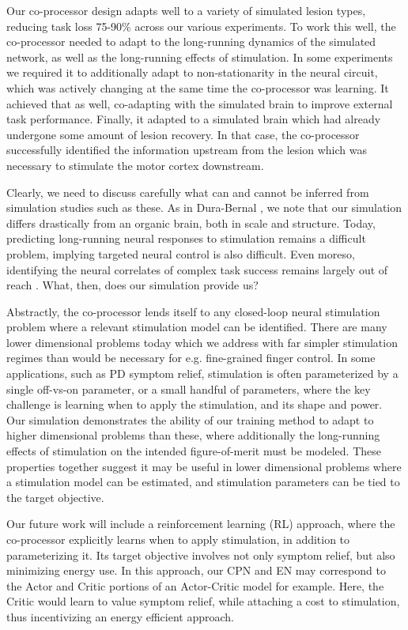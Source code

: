 \documentclass[12pt]{iopart}
\begin{document}
Our co-processor design adapts well to a variety of simulated lesion types, reducing task loss
75-90\% across our various experiments. To work this well, the co-processor needed to adapt to
the long-running dynamics of the simulated network, as well as the long-running effects of
stimulation. In some experiments we required it to additionally adapt to non-stationarity in
the neural circuit, which was actively changing at the same time the co-processor was learning.
It achieved that as well, co-adapting with the simulated brain to improve external task
performance. Finally, it adapted to a simulated brain which had already undergone some amount of
lesion recovery. In that case, the co-processor successfully identified the information upstream
from the lesion which was necessary to stimulate the motor cortex downstream.

Clearly, we need to discuss carefully what can and cannot be inferred from simulation studies
such as these. As in Dura-Bernal \cite{bernal.sim}, we note that our simulation differs
drastically from an organic brain, both in scale and structure. Today, predicting long-running
neural responses to stimulation remains a difficult problem, implying targeted neural control
is also difficult. Even moreso, identifying the neural correlates of complex task success
remains largely out of reach \cite{khanna.openloop}. What, then, does our simulation provide us?

Abstractly, the co-processor lends itself to any closed-loop neural stimulation problem
where a relevant stimulation model can be identified. There are many lower dimensional problems
today which we address with far simpler stimulation regimes than would be necessary for
e.g. fine-grained finger control. In some applications, such as PD symptom relief,
stimulation is often parameterized by a single off-vs-on parameter, or a small handful of
parameters, where the key challenge is learning when to apply the stimulation, and
its shape and power. Our simulation demonstrates the ability of our training method to
adapt to higher dimensional problems than these, where additionally the long-running
effects of stimulation on the intended figure-of-merit must be modeled. These properties
together suggest it may be useful in lower dimensional problems where a stimulation model
can be estimated, and stimulation parameters can be tied to the target objective.

Our future work will include a reinforcement learning (RL) approach, where the co-processor
explicitly learns when to apply stimulation, in addition to parameterizing it. Its target
objective involves not only symptom relief, but also minimizing energy use. In this approach,
our CPN and EN may correspond to the Actor and Critic portions of an Actor-Critic model
for example. Here, the Critic would learn to value symptom relief, while attaching a cost
to stimulation, thus incentivizing an energy efficient approach.
\end{document}
